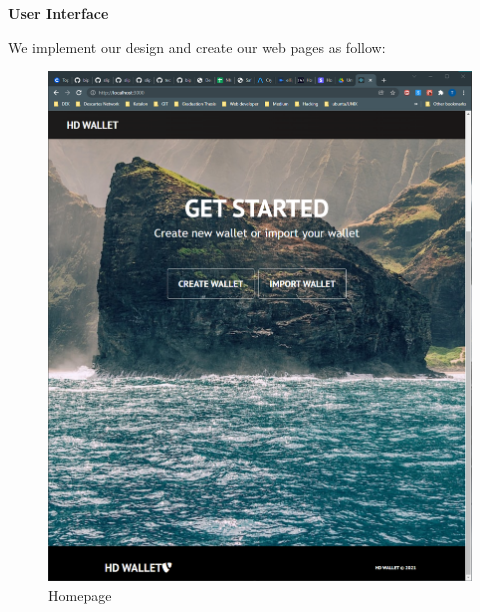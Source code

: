 \bigskip
{\textbf{User Interface}}
\bigskip

We implement our design and create our web pages as follow:

\begin{figure}[h!]
    \centering
    \includegraphics[width=1\textwidth]{images/Homepage.png}
    \caption[Homepage]{Homepage}
    \label{fig:homepage}
  \end{figure}


